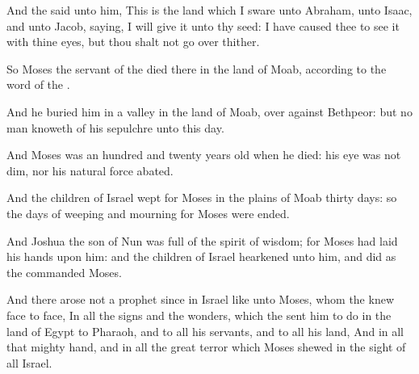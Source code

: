 \verse And the \LORD said unto him, This is the land which I sware unto Abraham, unto Isaac, and unto Jacob, saying, I will give it unto thy seed: I have caused thee to see it with thine eyes, but thou shalt not go over thither.

\verse So Moses the servant of the \LORD died there in the land of Moab, according to the word of the \LORD.

\verse And he buried him in a valley in the land of Moab, over against Bethpeor: but no man knoweth of his sepulchre unto this day.

\verse And Moses was an hundred and twenty years old when he died: his eye was not dim, nor his natural force abated.

\verse And the children of Israel wept for Moses in the plains of Moab thirty days: so the days of weeping and mourning for Moses were ended.

\verse And Joshua the son of Nun was full of the spirit of wisdom; for Moses had laid his hands upon him: and the children of Israel hearkened unto him, and did as the \LORD commanded Moses.

\verse And there arose not a prophet since in Israel like unto Moses, whom the \LORD knew face to face, \verse In all the signs and the wonders, which the \LORD sent him to do in the land of Egypt to Pharaoh, and to all his servants, and to all his land, \verse And in all that mighty hand, and in all the great terror which Moses shewed in the sight of all Israel.

